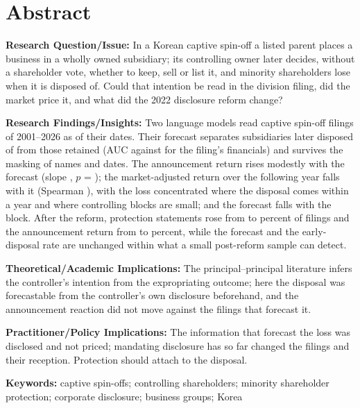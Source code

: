 \section*{Abstract}
\noindent\textbf{Research Question/Issue:} In a Korean captive spin-off a listed parent places a business in a wholly owned subsidiary; its controlling owner later decides, without a shareholder vote, whether to keep, sell or list it, and minority shareholders lose when it is disposed of. Could that intention be read in the division filing, did the market price it, and what did the 2022 disclosure reform change?
\par\noindent\textbf{Research Findings/Insights:} Two language models read \NScored{} captive spin-off filings of 2001--2026 as of their dates. Their forecast separates subsidiaries later disposed of from those retained (AUC \AUCPooledLLM{} against \AUCPooledFin{} for the filing's financials) and survives the masking of names and dates. The announcement return rises modestly with the forecast (slope \AnnCarSlope{}, $p$ = \AnnCarSlopeP); the market-adjusted return over the following year falls with it (Spearman \SpearmanScoreBhar{}), with the loss concentrated where the disposal comes within a year and where controlling blocks are small; and the forecast falls with the block. After the reform, protection statements rose from \ProtectPre{} to \ProtectPost{} percent of filings and the announcement return from \CarPre{} to \CarPost{} percent, while the forecast and the early-disposal rate are unchanged within what a small post-reform sample can detect.
\par\noindent\textbf{Theoretical/Academic Implications:} The principal--principal literature infers the controller's intention from the expropriating outcome; here the disposal was forecastable from the controller's own disclosure beforehand, and the announcement reaction did not move against the filings that forecast it.
\par\noindent\textbf{Practitioner/Policy Implications:} The information that forecast the loss was disclosed and not priced; mandating disclosure has so far changed the filings and their reception. Protection should attach to the disposal.
\par\medskip\noindent\textbf{Keywords:} captive spin-offs; controlling shareholders; minority shareholder protection; corporate disclosure; business groups; Korea